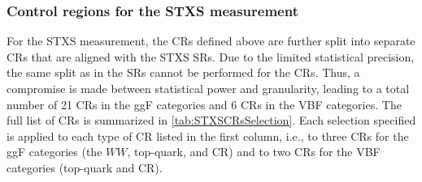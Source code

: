\subsubsection{Control regions for the STXS measurement}
\label{subsubsec:stxs-crs}
For the STXS measurement, the CRs defined above are further split into separate CRs that are aligned with the STXS SRs. Due to the limited statistical precision, the same split as in the SRs cannot be performed for the CRs. Thus, a compromise is made between statistical power and granularity, leading to a total number of 21 CRs in the ggF categories and 6 CRs in the VBF categories.
The full list of CRs is summarized in \cref{tab:STXSCRsSelection}.
Each selection specified is applied to each type of CR listed in the first column, i.e., to three CRs for the ggF categories (the $WW$, top-quark, and \Ztautau CR) and to two CRs for the VBF categories (top-quark and \Ztautau CR).
\begin{table}[ht]
    \caption[Event selection criteria used to define the STXS control regions.]{
        Event selection criteria used to define the control regions used in the STXS measurement.
        The selections start from the nominal CR selections summarized in \cref{tab:CRsSelection}.
    }
    \label{tab:STXSCRsSelection}
    \centering
    \resizebox{\textwidth}{!}{
        
    }
\end{table}


